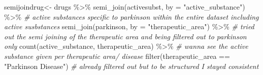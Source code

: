 \documentclass[
]{article}
\newenvironment{Shaded}{\begin{snugshade}}{\end{snugshade}}
\newcommand{\AttributeTok}[1]{\textcolor[rgb]{0.77,0.63,0.00}{#1}}
\newcommand{\CommentTok}[1]{\textcolor[rgb]{0.56,0.35,0.01}{\textit{#1}}}
\newcommand{\FunctionTok}[1]{\textcolor[rgb]{0.00,0.00,0.00}{#1}}
\newcommand{\NormalTok}[1]{#1}
\newcommand{\OtherTok}[1]{\textcolor[rgb]{0.56,0.35,0.01}{#1}}
\newcommand{\SpecialCharTok}[1]{\textcolor[rgb]{0.00,0.00,0.00}{#1}}
\newcommand{\StringTok}[1]{\textcolor[rgb]{0.31,0.60,0.02}{#1}}
\begin{document}
\begin{Shaded}
\begin{Highlighting}[]
\NormalTok{semijoindrug}\OtherTok{\textless{}{-}}\NormalTok{ drugs }\SpecialCharTok{\%\textgreater{}\%} 
  \FunctionTok{semi\_join}\NormalTok{(activesubst, }\AttributeTok{by =} \StringTok{"active\_substance"}\NormalTok{) }\SpecialCharTok{\%\textgreater{}\%}  \CommentTok{\# active substances specific to parkinson within the entire dataset including active susbstances}
  \FunctionTok{semi\_join}\NormalTok{(parkinson, }\AttributeTok{by =} \StringTok{"therapeutic\_area"}\NormalTok{) }\SpecialCharTok{\%\textgreater{}\%} \CommentTok{\# tried out the semi joining of the therapeutic area and being filtered out to parkinson only}
  \FunctionTok{count}\NormalTok{(active\_substance, therapeutic\_area) }\SpecialCharTok{\%\textgreater{}\%} \CommentTok{\# wanna see the active substance given per therapeutic area/ disease}
  \FunctionTok{filter}\NormalTok{(therapeutic\_area }\SpecialCharTok{==} \StringTok{"Parkinson Disease"}\NormalTok{) }\CommentTok{\# already filtered out but to be structured I stayed consistent}
\end{Highlighting}
\end{Shaded}
\end{document}
